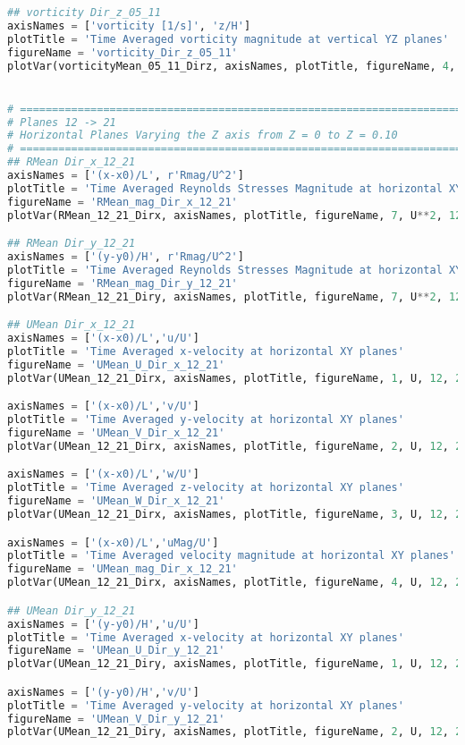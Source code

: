 \documentclass[../main.tex]{subfiles}
\begin{document}
\begin{lstlisting}[language=python]
## vorticity Dir_z_05_11
axisNames = ['vorticity [1/s]', 'z/H']
plotTitle = 'Time Averaged vorticity magnitude at vertical YZ planes'
figureName = 'vorticity_Dir_z_05_11'
plotVar(vorticityMean_05_11_Dirz, axisNames, plotTitle, figureName, 4, 1, 5, 11)


# =============================================================================
# Planes 12 -> 21
# Horizontal Planes Varying the Z axis from Z = 0 to Z = 0.10
# =============================================================================
## RMean Dir_x_12_21
axisNames = ['(x-x0)/L', r'Rmag/U^2']
plotTitle = 'Time Averaged Reynolds Stresses Magnitude at horizontal XY planes'
figureName = 'RMean_mag_Dir_x_12_21'
plotVar(RMean_12_21_Dirx, axisNames, plotTitle, figureName, 7, U**2, 12, 21)

## RMean Dir_y_12_21
axisNames = ['(y-y0)/H', r'Rmag/U^2']
plotTitle = 'Time Averaged Reynolds Stresses Magnitude at horizontal XY planes'
figureName = 'RMean_mag_Dir_y_12_21'
plotVar(RMean_12_21_Diry, axisNames, plotTitle, figureName, 7, U**2, 12, 21)

## UMean Dir_x_12_21
axisNames = ['(x-x0)/L','u/U']
plotTitle = 'Time Averaged x-velocity at horizontal XY planes'
figureName = 'UMean_U_Dir_x_12_21'
plotVar(UMean_12_21_Dirx, axisNames, plotTitle, figureName, 1, U, 12, 21)

axisNames = ['(x-x0)/L','v/U']
plotTitle = 'Time Averaged y-velocity at horizontal XY planes'
figureName = 'UMean_V_Dir_x_12_21'
plotVar(UMean_12_21_Dirx, axisNames, plotTitle, figureName, 2, U, 12, 21)

axisNames = ['(x-x0)/L','w/U']
plotTitle = 'Time Averaged z-velocity at horizontal XY planes'
figureName = 'UMean_W_Dir_x_12_21'
plotVar(UMean_12_21_Dirx, axisNames, plotTitle, figureName, 3, U, 12, 21)

axisNames = ['(x-x0)/L','uMag/U']
plotTitle = 'Time Averaged velocity magnitude at horizontal XY planes'
figureName = 'UMean_mag_Dir_x_12_21'
plotVar(UMean_12_21_Dirx, axisNames, plotTitle, figureName, 4, U, 12, 21)

## UMean Dir_y_12_21
axisNames = ['(y-y0)/H','u/U']
plotTitle = 'Time Averaged x-velocity at horizontal XY planes'
figureName = 'UMean_U_Dir_y_12_21'
plotVar(UMean_12_21_Diry, axisNames, plotTitle, figureName, 1, U, 12, 21)

axisNames = ['(y-y0)/H','v/U']
plotTitle = 'Time Averaged y-velocity at horizontal XY planes'
figureName = 'UMean_V_Dir_y_12_21'
plotVar(UMean_12_21_Diry, axisNames, plotTitle, figureName, 2, U, 12, 21)


\end{lstlisting}
\end{document}

